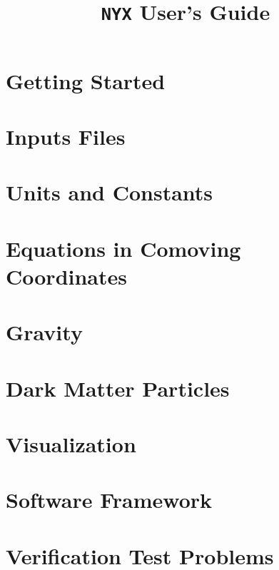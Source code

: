 \documentclass[11pt]{book}
\title{{\tt NYX} User's Guide}
\begin{document}
\maketitle
\tableofcontents

%

\chapter{Getting Started}


\chapter{Inputs Files}


\chapter{Units and Constants}


\chapter{Equations in Comoving Coordinates}


\chapter{Gravity}


\chapter{Dark Matter Particles}


\chapter{Visualization}


\chapter{Software Framework}


\chapter{Verification Test Problems}


\renewcommand\bibname{References}


\end{document}
